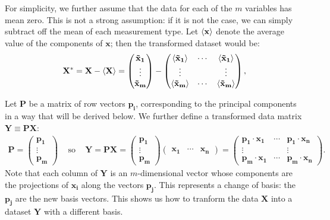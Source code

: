 \documentclass{article}
\renewcommand{\vec}{\mathbf}
\theoremstyle{definition}
\renewcommand{\sp}[1]{\;\;\;\text{ #1 }\;\;\;}
\begin{document}
For simplicity, we further assume that the data for each of the $m$
variables has mean zero. This is not a strong assumption: if it is
not the case, we can simply subtract off the mean of each measurement
type. Let $\ev{\vec x}$ denote the average value of the components of
$\vec x$; then the transformed dataset would be:
\begin{align*}
\vec{X^*}
= \vec X - \ev{\vec X}
=
\left(\begin{matrix}
\vec{\tilde x_1} \\
\vdots \\
\vec{\tilde x_m}
\end{matrix}\right)
-
\left(\begin{matrix}
\ev{\vec{\tilde x_1}} & \cdots & \ev{\vec{\tilde x_1}} \\
\vdots & & \vdots \\
\ev{\vec{\tilde x_m}} & \cdots & \ev{\vec{\tilde x_m}}
\end{matrix}\right),
\end{align*}

Let $\vec P$ be a matrix of row vectors $\vec{p_i}$, corresponding
to the principal components in a way that will be derived below.
We further define a transformed data matrix $\vec Y \equiv \vec P \vec X$:
\begin{align*}
\vec{P} = 
\left(\begin{matrix}
\vec{p_1} \\
\vdots \\
\vec{p_m}
\end{matrix}\right)
\sp{so}
\vec Y = \vec P \vec X
=
\left(\begin{matrix}
\vec{p_1} \\
\vdots \\
\vec{p_m}
\end{matrix}\right)
\left(\begin{matrix}
\vec{x_1} & \cdots & \vec{x_n}
\end{matrix}\right)
=
\left(\begin{matrix}
\vec{p_1} \cdot \vec{x_1} & \cdots & \vec{p_1} \cdot \vec{x_n} \\
\vdots & & \vdots \\
\vec{p_m} \cdot \vec{x_1} & \cdots & \vec{p_m} \cdot \vec{x_n}
\end{matrix}\right).
\end{align*}
Note that each column of $\vec Y$ is an $m$-dimensional vector
whose components are the projections of $\vec{x_i}$ along the
vectors $\vec{p_j}$. This represents a change of basis: the $\vec{p_j}$
are the new basis vectors. This shows us how to tranform the data
$\vec X$ into a dataset $\vec Y$ with a different basis.
\end{document}
